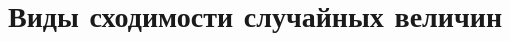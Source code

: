 \documentclass[11pt]{article}
\theoremstyle{break}
\begin{document}
\raggedright
\begin{sloppypar}
\section*{Виды сходимости случайных величин}



\end{sloppypar}
\end{document}
